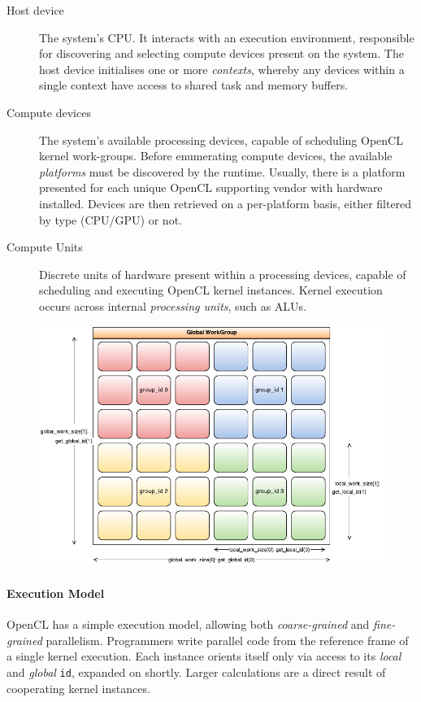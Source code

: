 \begin{description}
\item[Host device] The system's \ac{CPU}. It interacts with an execution environment, responsible for discovering and selecting compute devices present on the system. The host device initialises one or more \emph{contexts}, whereby any devices within a single context have access to shared task and memory buffers.

\item[Compute devices] The system's available processing devices, capable of scheduling \ac{OpenCL} kernel work-groups. Before enumerating compute devices, the available \emph{platforms} must be discovered by the runtime. Usually, there is a platform presented for each unique \ac{OpenCL} supporting vendor with hardware installed. Devices are then retrieved on a per-platform basis, either filtered by type (\ac{CPU}/\ac{GPU}) or not.

\item[Compute Units] Discrete units of hardware present within a processing devices, capable of scheduling and executing \ac{OpenCL} kernel instances.
Kernel execution occurs across internal \emph{processing units}, such as \acp{ALU}.
\end{description}

\begin{figure}[h]
	\includegraphics[width=4.8in]{./figures/workgroups}
	\label{fig:ocl_ex_model}
\end{figure}

\paragraph*{Execution Model}
\ac{OpenCL} has a simple execution model, allowing both \emph{coarse-grained} and \emph{fine-grained} parallelism. Programmers write parallel code from the reference frame of a single kernel execution. Each instance orients itself only via access to its \emph{local} and \emph{global} \verb|id|, expanded on shortly. Larger calculations are a direct result of cooperating kernel instances. 

